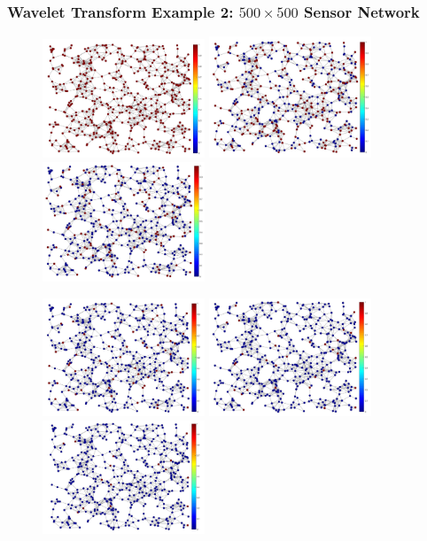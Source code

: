 \documentclass[a4paper]{article}
\begin{document}
\subsubsection{Wavelet Transform Example 2: $500\times 500$ Sensor Network}

\begin{figure}[h]
\centering
\includegraphics[width=4.84cm,keepaspectratio]{sensor_network/graph} \includegraphics[width=4.85cm,keepaspectratio]{sensor_network/downsample_stage_1} \includegraphics[width=4.85cm,keepaspectratio]{sensor_network/downsample_stage_2}

\includegraphics[width=4.84cm,keepaspectratio]{sensor_network/downsample_stage_3} \includegraphics[width=4.85cm,keepaspectratio]{sensor_network/downsample_stage_4} \includegraphics[width=4.85cm,keepaspectratio]{sensor_network/downsample_stage_5}


\end{figure}
\end{document}
